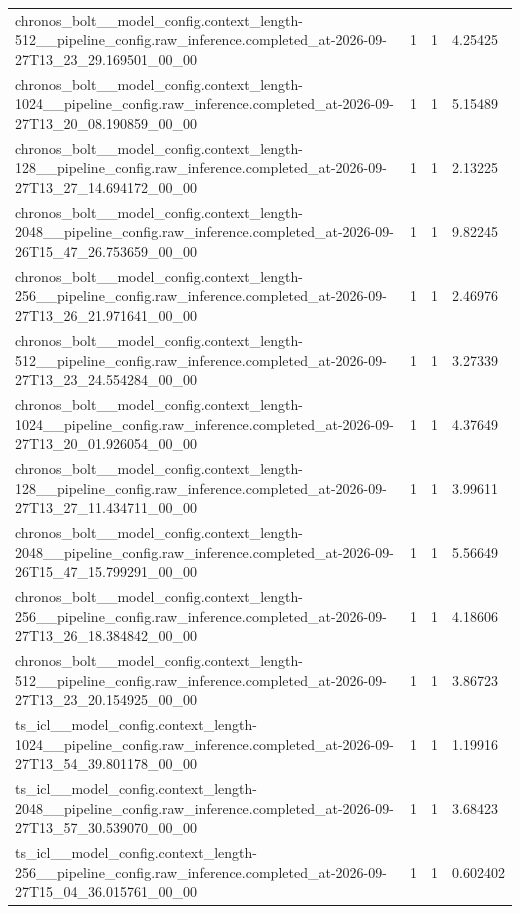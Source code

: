 \begin{tabular}{llll}
chronos\_bolt\_\_model\_config.context\_length-512\_\_pipeline\_config.raw\_inference.completed\_at-2026-09-27T13\_23\_29.169501\_00\_00 & 1 & 1 & 4.25425 \\
chronos\_bolt\_\_model\_config.context\_length-1024\_\_pipeline\_config.raw\_inference.completed\_at-2026-09-27T13\_20\_08.190859\_00\_00 & 1 & 1 & 5.15489 \\
chronos\_bolt\_\_model\_config.context\_length-128\_\_pipeline\_config.raw\_inference.completed\_at-2026-09-27T13\_27\_14.694172\_00\_00 & 1 & 1 & 2.13225 \\
chronos\_bolt\_\_model\_config.context\_length-2048\_\_pipeline\_config.raw\_inference.completed\_at-2026-09-26T15\_47\_26.753659\_00\_00 & 1 & 1 & 9.82245 \\
chronos\_bolt\_\_model\_config.context\_length-256\_\_pipeline\_config.raw\_inference.completed\_at-2026-09-27T13\_26\_21.971641\_00\_00 & 1 & 1 & 2.46976 \\
chronos\_bolt\_\_model\_config.context\_length-512\_\_pipeline\_config.raw\_inference.completed\_at-2026-09-27T13\_23\_24.554284\_00\_00 & 1 & 1 & 3.27339 \\
chronos\_bolt\_\_model\_config.context\_length-1024\_\_pipeline\_config.raw\_inference.completed\_at-2026-09-27T13\_20\_01.926054\_00\_00 & 1 & 1 & 4.37649 \\
chronos\_bolt\_\_model\_config.context\_length-128\_\_pipeline\_config.raw\_inference.completed\_at-2026-09-27T13\_27\_11.434711\_00\_00 & 1 & 1 & 3.99611 \\
chronos\_bolt\_\_model\_config.context\_length-2048\_\_pipeline\_config.raw\_inference.completed\_at-2026-09-26T15\_47\_15.799291\_00\_00 & 1 & 1 & 5.56649 \\
chronos\_bolt\_\_model\_config.context\_length-256\_\_pipeline\_config.raw\_inference.completed\_at-2026-09-27T13\_26\_18.384842\_00\_00 & 1 & 1 & 4.18606 \\
chronos\_bolt\_\_model\_config.context\_length-512\_\_pipeline\_config.raw\_inference.completed\_at-2026-09-27T13\_23\_20.154925\_00\_00 & 1 & 1 & 3.86723 \\
ts\_icl\_\_model\_config.context\_length-1024\_\_pipeline\_config.raw\_inference.completed\_at-2026-09-27T13\_54\_39.801178\_00\_00 & 1 & 1 & 1.19916 \\
ts\_icl\_\_model\_config.context\_length-2048\_\_pipeline\_config.raw\_inference.completed\_at-2026-09-27T13\_57\_30.539070\_00\_00 & 1 & 1 & 3.68423 \\
ts\_icl\_\_model\_config.context\_length-256\_\_pipeline\_config.raw\_inference.completed\_at-2026-09-27T15\_04\_36.015761\_00\_00 & 1 & 1 & 0.602402 \\

\end{tabular}

